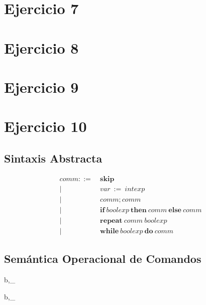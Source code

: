 \documentclass{article}
\begin{document}
\vspace{5mm}

\section{Ejercicio 7}


\section{Ejercicio 8}


\section{Ejercicio 9}



\section{Ejercicio 10}
\subsection{Sintaxis Abstracta}
\begin{align*}
comm ::=\ &\mathbf{skip}\\
|\ &var\ :=\ intexp\\
|\ &comm;comm\\
|\ &\mathbf{if\ } boolexp \mathbf{\ then\  } comm \mathbf{\ else\ } comm\\
|\ &\mathbf{repeat\ }comm\ boolexp\\
|\ &\mathbf{while\ } boolexp \mathbf{\ do\ } comm
\end{align*}

\subsection{Sem\'antica Operacional de Comandos}

{\langle b,\sigma \rangle \Downarrow_{} }

\vspace{5mm}

{\langle b,\sigma \rangle \Downarrow_{} }

\nocite{*}


\end{document}
